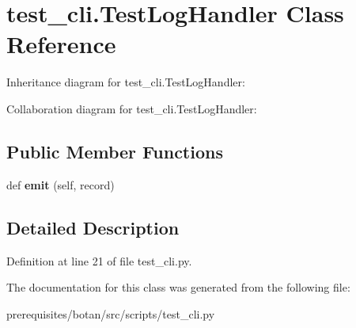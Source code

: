 \hypertarget{classtest__cli_1_1_test_log_handler}{}\section{test\+\_\+cli.\+Test\+Log\+Handler Class Reference}
\label{classtest__cli_1_1_test_log_handler}


Inheritance diagram for test\+\_\+cli.\+Test\+Log\+Handler\+:


Collaboration diagram for test\+\_\+cli.\+Test\+Log\+Handler\+:
\subsection*{Public Member Functions}
\begin{DoxyCompactItemize}
\item 
\mbox{\label{classtest__cli_1_1_test_log_handler_ac870e060504b2f673042278f55d30ff8}} 
def {\bfseries emit} (self, record)
\end{DoxyCompactItemize}


\subsection{Detailed Description}


Definition at line 21 of file test\+\_\+cli.\+py.



The documentation for this class was generated from the following file\+:\begin{DoxyCompactItemize}
\item 
prerequisites/botan/src/scripts/test\+\_\+cli.\+py\end{DoxyCompactItemize}
